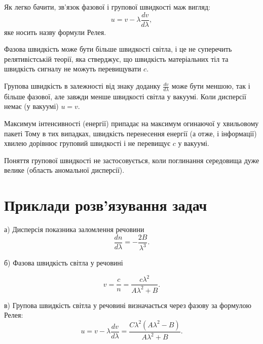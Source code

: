 Як легко бачити, зв'язок фазової і групової швидкості маж вигляд:
\begin{equation}\label{eq:Reley}
	u = v- \lambda \frac{dv}{d\lambda},
\end{equation}
яке носить назву формули Релея.

\begin{Attention}
	Фазова швидкість може бути більше швидкості світла, і це не суперечить релятивістській теорії, яка стверджує, що швидкість матеріальних тіл та швидкість сигналу не можуть перевищувати $c$.

	Групова швидкість в залежності від знаку доданку $\frac{dv}{d\lambda}$  може бути меншою, так і більше
	фазової, але завжди менше швидкості світла у вакуумі. Коли дисперсії немає (у вакуумі) $u = v$.

	Максимум інтенсивності (енергії) припадає на максимум огинаючої у хвильовому пакеті
	Тому в тих випадках, швидкість перенесення енергії (а отже, і інформації) хвилею дорівнює груповий швидкості і не перевищує $c$ у вакуумі.

	Поняття групової швидкості не застосовується, коли поглинання середовища дуже велике (область аномальної
	дисперсії).
\end{Attention}




\section{Приклади розв’язування задач}



\begin{solutionexample}[height fill=false]
	а) Дисперсія показника заломлення речовини
	\begin{equation*}
		\frac{dn}{d\lambda} = - \frac{2B}{\lambda^3}.
	\end{equation*}

	б) Фазова швидкість світла у речовині

	\begin{equation*}
		v = \frac{c}{n} = \frac{c\lambda^2}{A\lambda^2 + B}.
	\end{equation*}

	в) Групова швидкість світла у речовині визначається через фазову за формулою Релея:
	\begin{equation*}
		u = v - \lambda \frac{dv}{d\lambda} = \frac{C\lambda^2(A\lambda^2 - B)}{A\lambda^2 + B}.
	\end{equation*}
\end{solutionexample}



